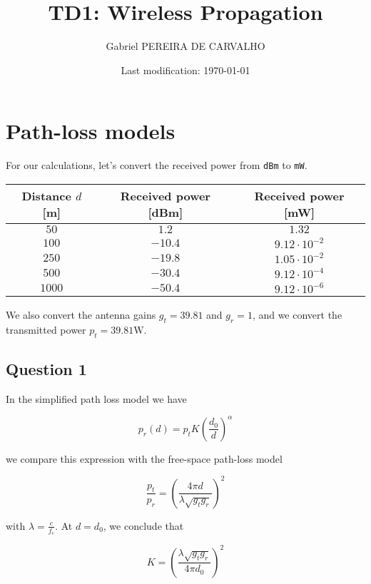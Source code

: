 \documentclass[]{article}
\title{TD1: Wireless Propagation}
\author{Gabriel PEREIRA DE CARVALHO}
\date{Last modification: \today}
\begin{document}
	
	\maketitle
	
	\section{Path-loss models}
	
	For our calculations, let's convert the received power from \texttt{dBm} to \texttt{mW}.
	
	\begin{center}
		\begin{tabular}{ |c|c|c| } 
			\hline
			Distance $d$ [m] & Received power [dBm] & Received power [mW] \\
			\hline
			$50$ & $1.2$ & $1.32$ \\
			\hline
			$100$ & $-10.4$ & $9.12 \cdot 10^{-2}$ \\
			\hline
			$250$ & $-19.8$ & $1.05 \cdot 10^{-2}$ \\
			\hline
			$500$ & $-30.4$ & $9.12 \cdot 10^{-4}$ \\
			\hline
			$1000$ & $-50.4$ & $9.12 \cdot 10^{-6}$ \\
			\hline
		\end{tabular}
	\end{center}
	
	We also convert the antenna gains $g_t = 39.81$ and $g_r = 1$, and we convert the transmitted power $p_t = 39.81\mathrm{W}$.
	
	\subsection*{Question 1}
	
	In the simplified path loss model we have
	
	\begin{equation}
		p_r(d) = p_t K \left(\frac{d_0}{d}\right)^\alpha
	\end{equation}
	
	we compare this expression with the free-space path-loss model
	
	\begin{equation}
		\frac{p_t}{p_r} = \left(\frac{4 \pi d}{\lambda \sqrt{g_t g_r}}\right)^2
	\end{equation}
	
	with $\lambda =\frac{c}{f_c}$. At $d = d_0$, we conclude that 
	
	\begin{equation}
		K = \left(\frac{\lambda \sqrt{g_t g_r}}{4 \pi d_0}\right)^2
	\end{equation}
	
\end{document}
